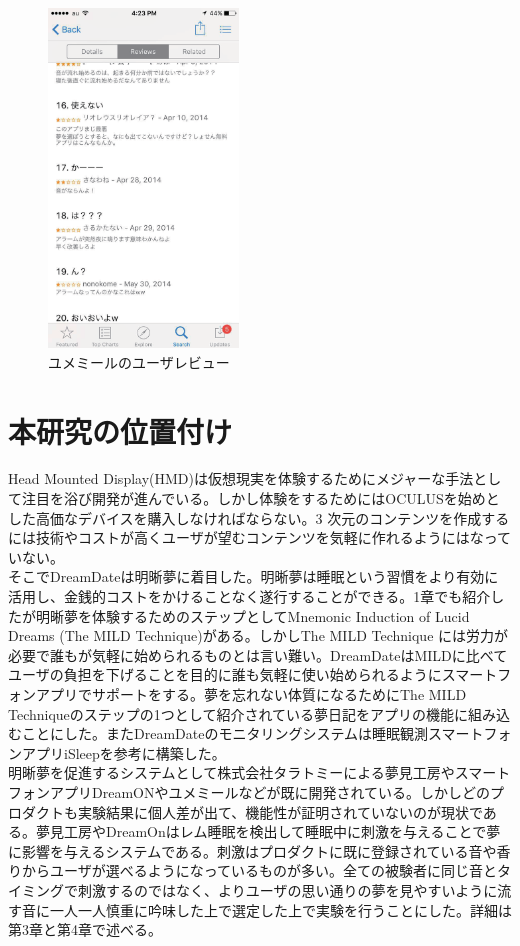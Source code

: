 \begin{figure}[htbp]
 \begin{minipage}{0.45\hsize}
\begin{center}
\includegraphics[height=90mm]{eps/yumemiru.eps}
\caption{ユメミールのユーザレビュー}
\label{DreamOnImage}
\end{center}
\end{minipage}
\end{figure}

\section{本研究の位置付け}
Head Mounted Display(HMD)は仮想現実を体験するためにメジャーな手法として注目を浴び開発が進んでいる。しかし体験をするためにはOCULUSを始めとした高価なデバイスを購入しなければならない。3 次元のコンテンツを作成するには技術やコストが高くユーザが望むコンテンツを気軽に作れるようにはなっていない。\\
そこでDreamDateは明晰夢に着目した。明晰夢は睡眠という習慣をより有効に活用し、金銭的コストをかけることなく遂行することができる。1章でも紹介したが明晰夢を体験するためのステップとしてMnemonic Induction of Lucid Dreams (The MILD Technique)がある。しかしThe MILD Technique には労力が必要で誰もが気軽に始められるものとは言い難い。DreamDateはMILDに比べてユーザの負担を下げることを目的に誰も気軽に使い始められるようにスマートフォンアプリでサポートをする。夢を忘れない体質になるためにThe MILD Techniqueのステップの1つとして紹介されている夢日記をアプリの機能に組み込むことにした。またDreamDateのモニタリングシステムは睡眠観測スマートフォンアプリiSleep\cite{iSleep}を参考に構築した。\\
明晰夢を促進するシステムとして株式会社タラトミーによる夢見工房やスマートフォンアプリDreamONやユメミールなどが既に開発されている。しかしどのプロダクトも実験結果に個人差が出て、機能性が証明されていないのが現状である。夢見工房やDreamOnはレム睡眠を検出して睡眠中に刺激を与えることで夢に影響を与えるシステムである。刺激はプロダクトに既に登録されている音や香りからユーザが選べるようになっているものが多い。全ての被験者に同じ音とタイミングで刺激するのではなく、よりユーザの思い通りの夢を見やすいように流す音に一人一人慎重に吟味した上で選定した上で実験を行うことにした。詳細は第3章と第4章で述べる。

